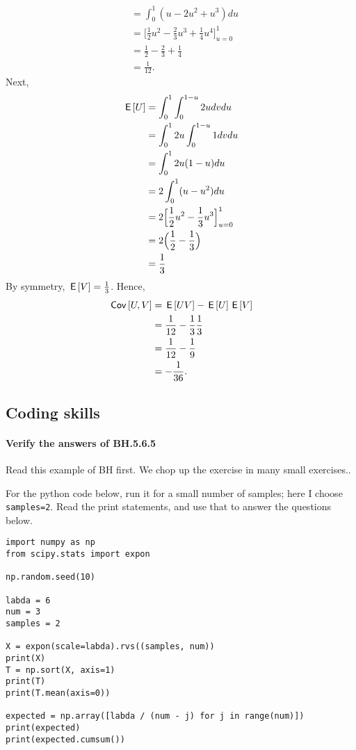 \documentclass[assignments]{subfiles}
\begin{document}
\begin{exercise}
\begin{solution}
\begin{enumerate}
\begin{align}
        &= \int_0^1 (u - 2u^2 + u^3) du \\
        &= \Big[ \frac{1}{2}u^2 - \frac{2}{3}u^3 + \frac{1}{4}u^4 \Big]_{u=0}^1 \\
        &= \frac{1}{2} - \frac{2}{3} + \frac{1}{4} \\
        &= \frac{1}{12}.
    \end{align}
    Next,
    \begin{align}
        \,\mathsf{E}\left[U\right] &= \int_0^1 \int_0^{1-u} 2 u dv du \\
        &= \int_0^1 2 u \int_0^{1-u} 1 dv du \\
        &= \int_0^1 2 u(1-u) du \\
        &= 2 \int_0^1 (u - u^2) du \\
        &= 2  \Big[\frac{1}{2}u^2 - \frac{1}{3}u^3\Big]_{u=0}^1 \\
        &= 2 \Big(\frac{1}{2} - \frac{1}{3}\Big) \\
        &= \frac{1}{3}
    \end{align}
    By symmetry, $\,\mathsf{E}\left[V\right] = \frac{1}{3}$. Hence,
    \begin{align}
        \,\mathsf{Cov}\left[U,V\right] &= \,\mathsf{E}\left[UV\right] - \,\mathsf{E}\left[U\right]\,\mathsf{E}\left[V\right] \\
        &= \frac{1}{12} - \frac{1}{3}\frac{1}{3}\\
        &= \frac{1}{12} - \frac{1}{9} \\
        &= -\frac{1}{36}.
    \end{align}
\end{enumerate}
\end{solution}
\end{exercise}


\subsection{Coding skills}
\label{sec:progr-assignm}


\paragraph{Verify the answers of BH.5.6.5}
Read this example of BH first.
We chop up the exercise in many small exercises..


For the python code below, run it for a small number of samples; here I choose \texttt{samples=2}. Read the print statements, and use that to answer the questions below.

\begin{verbatim}
import numpy as np
from scipy.stats import expon

np.random.seed(10)

labda = 6
num = 3
samples = 2

X = expon(scale=labda).rvs((samples, num))
print(X)
T = np.sort(X, axis=1)
print(T)
print(T.mean(axis=0))

expected = np.array([labda / (num - j) for j in range(num)])
print(expected)
print(expected.cumsum())
\end{verbatim}
\end{document}

